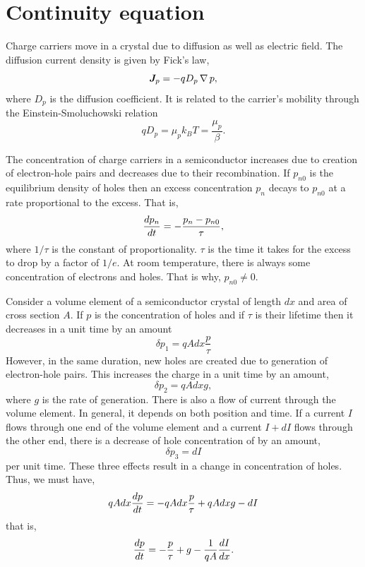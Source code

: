 \section{Continuity equation}\label{c1s5}
Charge carriers move in a crystal due to diffusion as well as electric field.
The diffusion current density is given by Fick's law,
\begin{equation}\label{c1e45}
\bm{J}_p = -qD_p\operatorname{\nabla} p,
\end{equation}
where $D_p$ is the diffusion coefficient. It is related to the carrier's 
mobility through the Einstein-Smoluchowski relation
\begin{equation}\label{c1e46}
qD_p = \mu_p k_BT = \frac{\mu_p}{\beta}.
\end{equation}

The concentration of charge carriers in a semiconductor increases due to
creation of electron-hole pairs and decreases due to their recombination. If
$p_{n0}$ is the equilibrium density of holes then an excess concentration $p_n$
decays to $p_{n0}$ at a rate proportional to the excess. That is,
\begin{equation}\label{c1e47}
\frac{d{p_n}}{d{t}} = -\frac{p_n - p_{n0}}{\tau},
\end{equation}
where $1/\tau$ is the constant of proportionality. $\tau$ is the time it takes
for the excess to drop by a factor of $1/e$. At room temperature, there is 
always some concentration of electrons and holes. That is why, $p_{n0} \ne 0$.

Consider a volume element of a semiconductor crystal of length $dx$ and area of
cross section $A$. If $p$ is the concentration of holes and if $\tau$ is their
lifetime then it decreases in a unit time by an amount
\begin{equation}\label{c1e48}
\delta{p}_1= qAdx\frac{p}{\tau}
\end{equation}
However, in the same duration, new holes are created due to generation of 
electron-hole pairs. This increases the charge in a unit time by an amount,
\begin{equation}\label{c1e49}
\delta{p}_2 = qAdxg,
\end{equation}
where $g$ is the rate of generation.
There is also a flow of current through the volume element. In general, it 
depends on both position and time. If a current $I$ flows through one end of the
volume element and a current $I + dI$ flows through the other end, there is a
decrease of hole concentration of by an amount,
\begin{equation}\label{c1e50}
\delta{p}_3 = dI
\end{equation}
per unit time. These three effects result in a change in concentration of holes.
Thus, we must have,
\[
qAdx\frac{d{p}}{d{t}} = -qAdx\frac{p}{\tau} + qAdxg - dI
\]
that is,
\begin{equation}\label{c1e51}
\frac{d{p}}{d{t}} = -\frac{p}{\tau} + g - \frac{1}{qA}\frac{d{I}}{d{x}}.
\end{equation}

